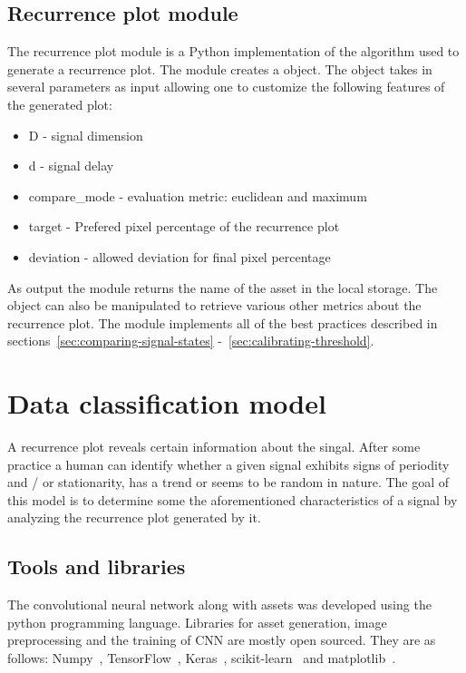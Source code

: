 \documentclass[a4paper,12pt,fleqn]{article}
\begin{document}
\subsection{Recurrence plot module}
\label{sec:recurrence_plot_module}
The recurrence plot module is a Python implementation of the algorithm used to generate a recurrence plot.
The module creates a  object.
The object takes in several parameters as input allowing one to customize the following features of the generated plot:
\begin{itemize}
  \item D - signal dimension
  \item d - signal delay
  \item compare\_mode - evaluation metric: euclidean and maximum
  \item target - Prefered pixel percentage of the recurrence plot
  \item deviation - allowed deviation for final pixel percentage
\end{itemize}
As output the module returns the name of the asset in the local storage.
The object can also be manipulated to retrieve various other metrics about the recurrence plot.
The module implements all of the best practices described in sections~\ref{sec:comparing-signal-states} -~\ref{sec:calibrating-threshold}.


\section{Data classification model}
A recurrence plot reveals certain information about the singal.
After some practice a human can identify whether a given signal exhibits signs of periodity and / or stationarity, has a trend or seems to be random in nature.
The goal of this model is to determine some the aforementioned characteristics of a signal by analyzing the recurrence plot generated by it.


\subsection{Tools and libraries}
The convolutional neural network along with assets was developed using the python programming language. Libraries for asset generation, image preprocessing and the training of CNN are mostly open sourced. They are as follows: Numpy~\cite{numpy}, TensorFlow~\cite{tensorflow}, Keras~\cite{keras}, scikit-learn~\cite{scikit-learn} and matplotlib~\cite{matplotlib}.
\end{document}
